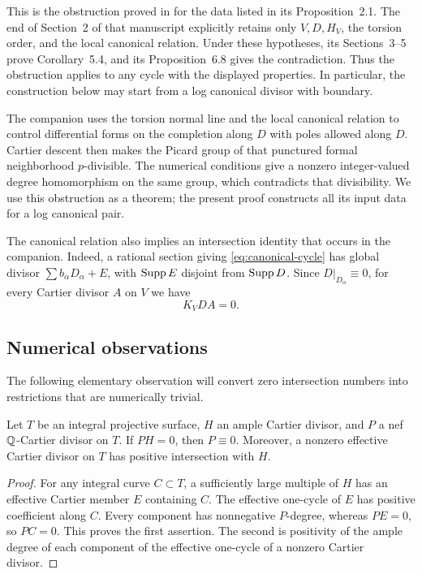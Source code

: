 This is the obstruction proved in \cite[Sections~3--6]{Companion} for the
data listed in its Proposition~2.1. The end of Section~2 of that manuscript
explicitly retains only $V,D,H_V$, the torsion order, and the local canonical
relation. Under these hypotheses, its Sections~3--5 prove Corollary~5.4,
and its Proposition~6.8 gives the contradiction. Thus the obstruction
applies to any cycle with the displayed properties. In particular, the
construction below may start from a log canonical divisor with boundary.

The companion uses the torsion normal line and the local canonical
relation to control differential forms on the completion along $D$ with
poles allowed along $D$. Cartier descent then makes the Picard group of
that punctured formal neighborhood $p$-divisible. The numerical conditions
give a nonzero integer-valued degree homomorphism on the same group,
which contradicts that divisibility. We use this obstruction as a theorem;
the present proof constructs all its input data for a log canonical pair.

The canonical relation also implies an intersection identity that occurs
in the companion. Indeed, a rational section giving
\eqref{eq:canonical-cycle} has global divisor
$\sum b_\alpha D_\alpha+E$, with $\operatorname{Supp} E$ disjoint from $\operatorname{Supp} D$.
Since $D|_{D_\alpha}\equiv0$, for every Cartier divisor $A$ on $V$ we have
\begin{equation}\label{eq:canonical-intersection}
K_VDA=0.
\end{equation}

\subsection{Numerical observations}

The following elementary observation will convert zero intersection
numbers into restrictions that are numerically trivial.

\begin{lemma}\label{lem:surface-nef}
Let $T$ be an integral projective surface, $H$ an ample Cartier divisor,
and $P$ a nef $\mathbb Q$-Cartier divisor on $T$. If $PH=0$, then $P\equiv0$.
Moreover, a nonzero effective Cartier divisor on $T$ has positive
intersection with $H$.
\end{lemma}
\begin{proof}
For any integral curve $C\subset T$, a sufficiently large multiple of $H$
has an effective Cartier member $E$ containing $C$. The effective
one-cycle of $E$ has positive coefficient along $C$. Every component has
nonnegative $P$-degree, whereas $PE=0$, so $PC=0$. This proves the first
assertion. The second is positivity of the ample degree of each component
of the effective one-cycle of a nonzero Cartier divisor.
\end{proof}

